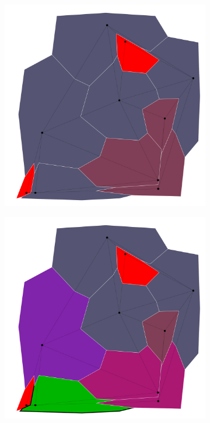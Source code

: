 \documentclass{article}
\begin{document}
\begin{figure}[h!]
\begin{subfigure}{0.18\textwidth}
				\includegraphics[width=\textwidth]{images/sequences/mac_backtracking/bt_mac_I00004}
				\caption{}
			\end{subfigure}
			\;
			\begin{subfigure}{0.18\textwidth}
				\centering
				\includegraphics[width=\textwidth]{images/sequences/mac_backtracking/bt_mac_I00006}

\end{subfigure}
\end{figure}
\end{document}
